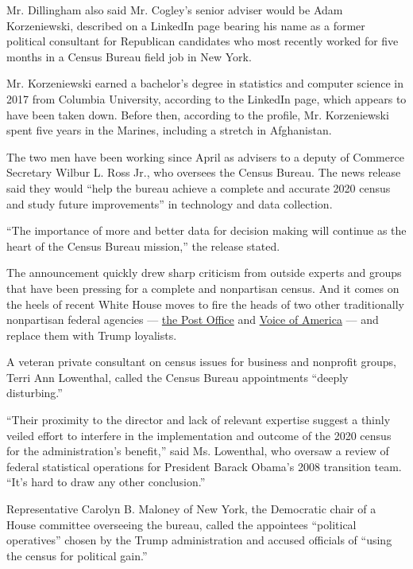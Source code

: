 Mr. Dillingham also said Mr. Cogley's senior adviser would be Adam
Korzeniewski, described on a LinkedIn page bearing his name as a former
political consultant for Republican candidates who most recently worked
for five months in a Census Bureau field job in New York.

Mr. Korzeniewski earned a bachelor's degree in statistics and computer
science in 2017 from Columbia University, according to the LinkedIn
page, which appears to have been taken down. Before then, according to
the profile, Mr. Korzeniewski spent five years in the Marines, including
a stretch in Afghanistan.

The two men have been working since April as advisers to a deputy of
Commerce Secretary Wilbur L. Ross Jr., who oversees the Census Bureau.
The news release said they would ``help the bureau achieve a complete
and accurate 2020 census and study future improvements'' in technology
and data collection.

``The importance of more and better data for decision making will
continue as the heart of the Census Bureau mission,'' the release
stated.

The announcement quickly drew sharp criticism from outside experts and
groups that have been pressing for a complete and nonpartisan census.
And it comes on the heels of recent White House moves to fire the heads
of two other traditionally nonpartisan federal agencies ---
\href{https://www.nytimes.com/2020/05/07/us/politics/postmaster-general-louis-dejoy.html}{the
Post Office} and
\href{https://www.nytimes.com/2020/06/15/us/politics/voice-of-american-resignations.html}{Voice
of America} --- and replace them with Trump loyalists.

A veteran private consultant on census issues for business and nonprofit
groups, Terri Ann Lowenthal, called the Census Bureau appointments
``deeply disturbing.''

``Their proximity to the director and lack of relevant expertise suggest
a thinly veiled effort to interfere in the implementation and outcome of
the 2020 census for the administration's benefit,'' said Ms. Lowenthal,
who oversaw a review of federal statistical operations for President
Barack Obama's 2008 transition team. ``It's hard to draw any other
conclusion.''

Representative Carolyn B. Maloney of New York, the Democratic chair of a
House committee overseeing the bureau, called the appointees ``political
operatives'' chosen by the Trump administration and accused officials of
``using the census for political gain.''

